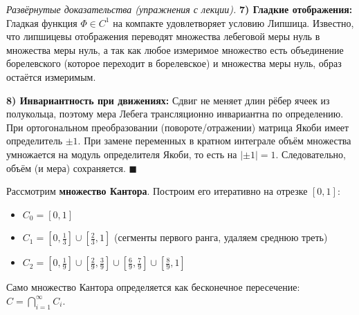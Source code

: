 \documentclass[12pt,a4paper]{article}
\newenvironment{Proof}[1][Доказательство]{\vspace{0.5em}\noindent\textit{#1.}\hspace{0.5em}\ignorespaces}{\hfill$\blacksquare$\vspace{1em}}
\begin{document}
\begin{Proof}[Развёрнутые доказательства (упражнения с лекции)]
\textbf{7) Гладкие отображения:} Гладкая функция $\Phi \in C^1$ на компакте удовлетворяет условию Липшица. Известно, что липшицевы отображения переводят множества лебеговой меры нуль в множества меры нуль, а так как любое измеримое множество есть объединение борелевского (которое переходит в борелевское) и множества меры нуль, образ остаётся измеримым.

\textbf{8) Инвариантность при движениях:} Сдвиг не меняет длин рёбер ячеек из полукольца, поэтому мера Лебега трансляционно инвариантна по определению. При ортогональном преобразовании (повороте/отражении) матрица Якоби имеет определитель $\pm 1$. При замене переменных в кратном интеграле объём множества умножается на модуль определителя Якоби, то есть на $| \pm 1 | = 1$. Следовательно, объём (и мера) сохраняется.
\end{Proof}

\begin{Example}
Рассмотрим \textbf{множество Кантора}. Построим его итеративно на отрезке $[0, 1]$:
\begin{itemize}
    \item $C_0 = [0, 1]$
    \item $C_1 = \left[0, \frac{1}{3}\right] \cup \left[\frac{2}{3}, 1\right]$ (сегменты первого ранга, удаляем среднюю треть)
    \item $C_2 = \left[0, \frac{1}{9}\right] \cup \left[\frac{2}{9}, \frac{3}{9}\right] \cup \left[\frac{6}{9}, \frac{7}{9}\right] \cup \left[\frac{8}{9}, 1\right]$
\end{itemize}
Само множество Кантора определяется как бесконечное пересечение: $C = \bigcap\limits_{i=1}^{\infty} C_i$.

\begin{center}
\end{center}
\end{Example}
\end{document}
